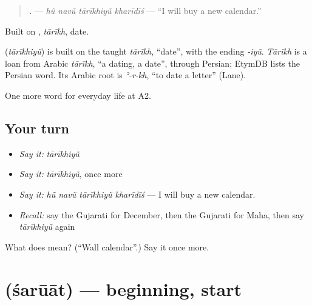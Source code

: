 \begin{quote}
\textbf{   .} — \emph{hũ navũ tārīkhiyũ kharīdīś} — \textquotedblleft{}I will buy a new calendar.\textquotedblright{}
\end{quote}

Built on \textbf{}, \emph{tārīkh}, date.

\begin{cousinweb}
\textbf{} (\emph{tārīkhiyũ}) is built on the taught \emph{tārīkh}, \textquotedblleft{}date\textquotedblright{}, with the ending \emph{-iyũ}. \emph{Tārīkh} is a loan from Arabic \emph{tārīkh}, \textquotedblleft{}a dating, a date\textquotedblright{}, through Persian; EtymDB lists the Persian word. Its Arabic root is \emph{ʾ-r-kh}, \textquotedblleft{}to date a letter\textquotedblright{} (Lane).
\end{cousinweb}

\begin{grammarlens}[title={What you've built}]
One more word for everyday life at A2.
\end{grammarlens}

\subsection*{Your turn}
\begin{itemize}
\raggedright
  \item \emph{Say it:} \emph{tārīkhiyũ}
  \item \emph{Say it:} \emph{tārīkhiyũ}, once more
  \item \emph{Say it:} \emph{hũ navũ tārīkhiyũ kharīdīś} — I will buy a new calendar.
  \item \emph{Recall:} say the Gujarati for December, then the Gujarati for Maha, then say \emph{tārīkhiyũ} again
\end{itemize}

\begin{tcolorbox}[breakable,colback=teal!4,colframe=teal!35!black,title={Before you move on}]
What does  mean? (\textquotedblleft{}Wall calendar\textquotedblright{}.) Say it once more.
\end{tcolorbox}
\section[\texorpdfstring{\gu{શરૂઆત} (śarūāt)}{શરૂઆત (śarūāt)}]{ (śarūāt) — beginning, start}

\label{lesson:GU-C174-saruat}



